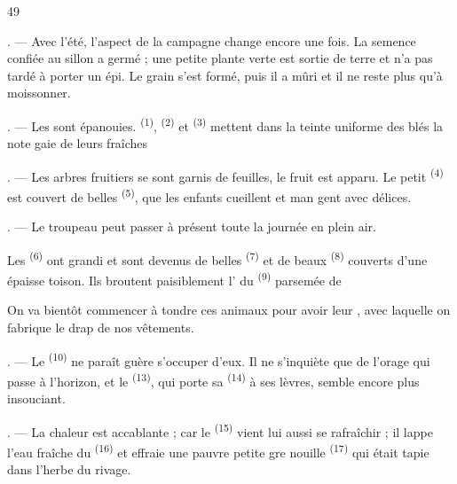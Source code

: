 \begin{VUpage}[51]{49}
\VUsaut{5.0mm}
\VUsaut{1.4mm}
\VUsaut{2.2mm}
\VUsaut{6.4mm}

. --- Avec l'été, l'aspect de la campagne change\nl
encore une fois. La semence confiée au sillon a germé ;\nl
une petite plante verte est sortie de terre et n'a pas\nl
tardé à porter un épi. Le grain s'est formé, puis il a\nl
mûri et il ne reste plus qu'à moissonner.

. --- Les  sont épanouies.\nl
{} \textsuperscript{(1)},  \textsuperscript{(2)} et  \textsuperscript{(3)} mettent\nl
dans la teinte uniforme des blés la note gaie de leurs\nl
fraîches 

. --- Les arbres fruitiers se sont garnis de feuilles,\nl
le fruit est apparu. Le petit  \textsuperscript{(4)} est couvert\nl
de belles  \textsuperscript{(5)}, que les enfants cueillent et man\cc
gent avec délices.

. --- Le troupeau peut passer à présent toute la\nl
journée en plein air.

\VUblancAlinea
Les  \textsuperscript{(6)} ont grandi et sont devenus de belles\nl
{} \textsuperscript{(7)} et de beaux  \textsuperscript{(8)} couverts d'une\nl
épaisse toison. Ils broutent paisiblement l' du\nl
{} \textsuperscript{(9)} parsemée de 

\VUblancAlinea
On va bientôt commencer à tondre ces animaux\nl
pour avoir leur , avec laquelle on fabrique le\nl
drap de nos vêtements.

. --- Le  \textsuperscript{(10)} ne paraît guère s'occuper d'eux.\nl
Il ne s'inquiète que de l'orage qui passe à l'horizon, et\nl
le  \textsuperscript{(13)}, qui porte sa  \textsuperscript{(14)} à ses lèvres,\nl
semble encore plus insouciant.

. --- La chaleur est accablante ; car le  \textsuperscript{(15)}\nl
vient lui aussi se rafraîchir ; il lappe l'eau fraîche\nl
du  \textsuperscript{(16)} et effraie une pauvre petite gre\cc
nouille \textsuperscript{(17)} qui était tapie dans l'herbe du rivage.
\parplein
\end{VUpage}

